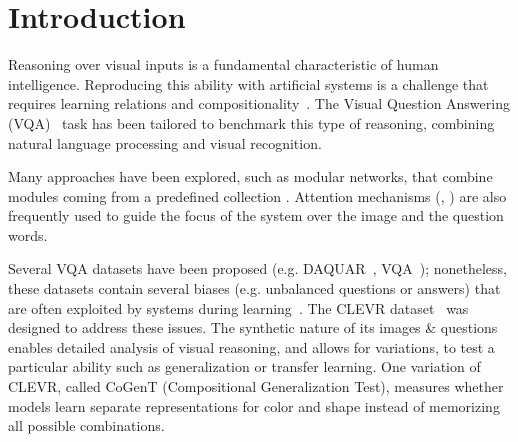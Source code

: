 \section{Introduction}
Reasoning over visual inputs is a fundamental characteristic of human intelligence.
Reproducing this ability with artificial systems is a challenge that requires learning relations and compositionality~\citep{hu2017learning, johnson2017inferring}. The Visual Question Answering (VQA)~\citep{antol2015vqa,malinowski2014towards,wu2017visual} task has been tailored to benchmark this type of reasoning, combining natural language processing and visual recognition.


Many approaches have been explored, 
such as modular networks, that combine modules coming from a predefined collection \cite{andreas2016learning,johnson2017inferring, mascharka2018transparency}. Attention mechanisms (\cite{bahdanau2014neural}, \cite{xu2015show}) are also frequently used to guide the focus of the system over the image and the question words.


Several VQA datasets have been proposed (e.g. DAQUAR~\citep{malinowski2014multi}, VQA~\citep{antol2015vqa}); nonetheless, these datasets contain several biases (e.g. unbalanced questions or answers) that are often exploited by systems during learning~\citep{goyal2017making}.
The CLEVR dataset~\citep{johnson2017clevr} was designed to address these issues. The synthetic nature of its images \& questions enables detailed analysis of visual reasoning, and allows for variations, to test a particular ability such as generalization or transfer learning. One variation of CLEVR, called CoGenT (Compositional Generalization Test), measures whether models learn separate representations for color and shape instead of memorizing all possible combinations.


